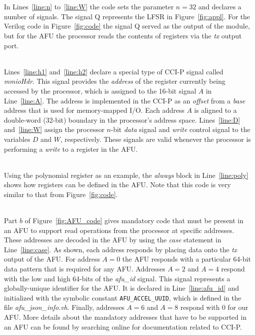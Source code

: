 \documentclass[epsfig,10pt,fullpage]{article}
\begin{document}
~\\
~\\
\noindent
In Lines~\ref{line:n} to~\ref{line:W} the code sets the parameter $n=32$ and declares a
number of signals. The signal Q represents the LFSR in Figure~\ref{fig:appl}. For the 
Verilog code in Figure~\ref{fig:code} the signal Q served as the output of the module, but 
for the AFU the processor reads the contents of registers via the {\it tx} output port.

~\\
\noindent
Lines~\ref{line:h1} and~\ref{line:h2} declare a special type of CCI-P signal called 
{\it mmioHdr}. This signal provides the {\it address} of the register currently being 
accessed by the processor, which is assigned to the 16-bit signal $A$ in Line~\ref{line:A}. 
The address is implemented in the CCI-P as an {\it offset} from a {\it base} address 
that is used for memory-mapped I/O. Each address $A$ is aligned to a double-word (32-bit) 
boundary in the processor's address space. Lines~\ref{line:D} and~\ref{line:W}
assign the processor $n$-bit {\it data} signal and {\it write} control signal to the 
variables $D$ and $W$, respectively. These signals are valid whenever the processor is 
performing a {\it write} to a register in the AFU. 

~\\
\noindent
Using the polynomial register as an example, the {\it always} block 
in Line~\ref{line:poly} shows how registers can be defined in the AFU. Note that this code 
is very similar to that from Figure~\ref{fig:code}. 

~\\
\noindent
Part $b$ of Figure~\ref{fig:AFU_code} gives mandatory code that must be present in an AFU 
to support read operations from the processor at specific addresses. These addresses are decoded
in the AFU by using the {\it case} statement in Line~\ref{line:case}. As shown, each
address responds by placing data onto the {\it tx} output of the AFU. For address $A = 0$
the AFU responds with a particular 64-bit data pattern that is required for any AFU. Addresses
$A=2$ and $A=4$ respond with the low and high 64-bits of the {\it afu\_id} signal. This signal
represents a globally-unique identifier for the AFU. It is declared in Line~\ref{line:afu_id}
and initialized with the symbolic constant \texttt{AFU\_ACCEL\_UUID}, which is
defined in the file {\it afu\_json\_info.vh}.  Finally, addresses $A=6$ and $A=8$
respond with 0 for our AFU.  More details about the mandatory addresses that have to be
supported in an AFU can be found by searching online for documentation related to CCI-P.
\end{document}
